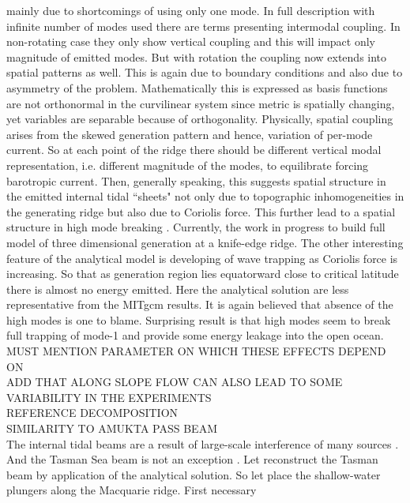 \documentclass[12pt]{article}
\begin{document}
mainly due to shortcomings of using only one mode. In full description with infinite number of 
modes used there are terms presenting intermodal coupling. In non-rotating case they only 
show vertical coupling \citep{st2003generation} and this will impact only magnitude of emitted 
modes. But with rotation the coupling now extends into spatial patterns as well. This is again due 
to boundary conditions and also due to asymmetry of the problem. Mathematically this is expressed 
as basis functions are not orthonormal in the curvilinear system since metric is spatially 
changing, yet variables are separable because of orthogonality. Physically, spatial coupling arises 
from the skewed generation pattern and hence, variation of per-mode current. So at each point of 
the ridge there should be different vertical modal representation, i.e. different magnitude of the 
modes, to equilibrate forcing barotropic current. Then, generally speaking, this suggests spatial 
structure in the emitted internal tidal ``sheets" \citep{johnston2015standing} not only due to 
topographic inhomogeneities in the generating ridge but also due to Coriolis force. This further 
lead to a spatial structure in high mode breaking \citep{buhler2007instability}. Currently, the 
work in progress to build full model of three dimensional generation at a knife-edge ridge. The 
other interesting feature of the analytical model is developing of wave trapping as Coriolis 
force is increasing. So that as generation region lies equatorward close to critical latitude there 
is almost no energy emitted. Here the analytical solution are less representative from the MITgcm 
results. It is again believed that absence of the high modes is one to blame. Surprising result 
is that high modes seem to break full trapping of mode-1 and provide some energy leakage into the 
open ocean.\\
MUST MENTION PARAMETER ON WHICH THESE EFFECTS DEPEND ON\\
ADD THAT ALONG SLOPE FLOW CAN ALSO LEAD TO SOME VARIABILITY IN THE EXPERIMENTS\\
REFERENCE DECOMPOSITION\\
SIMILARITY TO AMUKTA PASS BEAM\\
The internal tidal beams are a result of large-scale interference of many sources 
\citep{rainville2010interference}. And the Tasman Sea beam is not an exception 
\citep{klymak2016reflection}. Let reconstruct the Tasman beam by application of the analytical 
solution. So let place the shallow-water plungers along the Macquarie ridge. First necessary  
\end{document}
